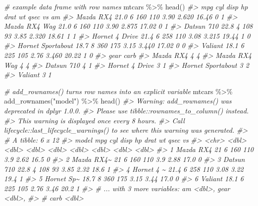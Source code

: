 \documentclass[
]{book}
\newenvironment{Shaded}{\begin{snugshade}}{\end{snugshade}}
\newcommand{\CommentTok}[1]{\textcolor[rgb]{0.56,0.35,0.01}{\textit{#1}}}
\newcommand{\FunctionTok}[1]{\textcolor[rgb]{0.00,0.00,0.00}{#1}}
\newcommand{\NormalTok}[1]{#1}
\newcommand{\SpecialCharTok}[1]{\textcolor[rgb]{0.00,0.00,0.00}{#1}}
\newcommand{\StringTok}[1]{\textcolor[rgb]{0.31,0.60,0.02}{#1}}
\begin{document}
\begin{Shaded}
\begin{Highlighting}[]
\CommentTok{\# example data frame with row names}
\NormalTok{mtcars }\SpecialCharTok{\%\textgreater{}\%} \FunctionTok{head}\NormalTok{()}
\CommentTok{\#\textgreater{}                    mpg cyl disp  hp drat    wt  qsec vs am}
\CommentTok{\#\textgreater{} Mazda RX4         21.0   6  160 110 3.90 2.620 16.46  0  1}
\CommentTok{\#\textgreater{} Mazda RX4 Wag     21.0   6  160 110 3.90 2.875 17.02  0  1}
\CommentTok{\#\textgreater{} Datsun 710        22.8   4  108  93 3.85 2.320 18.61  1  1}
\CommentTok{\#\textgreater{} Hornet 4 Drive    21.4   6  258 110 3.08 3.215 19.44  1  0}
\CommentTok{\#\textgreater{} Hornet Sportabout 18.7   8  360 175 3.15 3.440 17.02  0  0}
\CommentTok{\#\textgreater{} Valiant           18.1   6  225 105 2.76 3.460 20.22  1  0}
\CommentTok{\#\textgreater{}                   gear carb}
\CommentTok{\#\textgreater{} Mazda RX4            4    4}
\CommentTok{\#\textgreater{} Mazda RX4 Wag        4    4}
\CommentTok{\#\textgreater{} Datsun 710           4    1}
\CommentTok{\#\textgreater{} Hornet 4 Drive       3    1}
\CommentTok{\#\textgreater{} Hornet Sportabout    3    2}
\CommentTok{\#\textgreater{} Valiant              3    1}

\CommentTok{\# add\_rownames() turns row names into an explicit variable}
\NormalTok{mtcars }\SpecialCharTok{\%\textgreater{}\%} \FunctionTok{add\_rownames}\NormalTok{(}\StringTok{"model"}\NormalTok{) }\SpecialCharTok{\%\textgreater{}\%} \FunctionTok{head}\NormalTok{()}
\CommentTok{\#\textgreater{} Warning: \textasciigrave{}add\_rownames()\textasciigrave{} was deprecated in dplyr 1.0.0.}
\CommentTok{\#\textgreater{} Please use \textasciigrave{}tibble::rownames\_to\_column()\textasciigrave{} instead.}
\CommentTok{\#\textgreater{} This warning is displayed once every 8 hours.}
\CommentTok{\#\textgreater{} Call \textasciigrave{}lifecycle::last\_lifecycle\_warnings()\textasciigrave{} to see where this warning was generated.}
\CommentTok{\#\textgreater{} \# A tibble: 6 x 12}
\CommentTok{\#\textgreater{}   model        mpg   cyl  disp    hp  drat    wt  qsec    vs}
\CommentTok{\#\textgreater{}   \textless{}chr\textgreater{}      \textless{}dbl\textgreater{} \textless{}dbl\textgreater{} \textless{}dbl\textgreater{} \textless{}dbl\textgreater{} \textless{}dbl\textgreater{} \textless{}dbl\textgreater{} \textless{}dbl\textgreater{} \textless{}dbl\textgreater{}}
\CommentTok{\#\textgreater{} 1 Mazda RX4   21       6   160   110  3.9   2.62  16.5     0}
\CommentTok{\#\textgreater{} 2 Mazda RX4\textasciitilde{}  21       6   160   110  3.9   2.88  17.0     0}
\CommentTok{\#\textgreater{} 3 Datsun 710  22.8     4   108    93  3.85  2.32  18.6     1}
\CommentTok{\#\textgreater{} 4 Hornet 4 \textasciitilde{}  21.4     6   258   110  3.08  3.22  19.4     1}
\CommentTok{\#\textgreater{} 5 Hornet Sp\textasciitilde{}  18.7     8   360   175  3.15  3.44  17.0     0}
\CommentTok{\#\textgreater{} 6 Valiant     18.1     6   225   105  2.76  3.46  20.2     1}
\CommentTok{\#\textgreater{} \# ... with 3 more variables: am \textless{}dbl\textgreater{}, gear \textless{}dbl\textgreater{},}
\CommentTok{\#\textgreater{} \#   carb \textless{}dbl\textgreater{}}


\end{Highlighting}
\end{Shaded}
\end{document}
